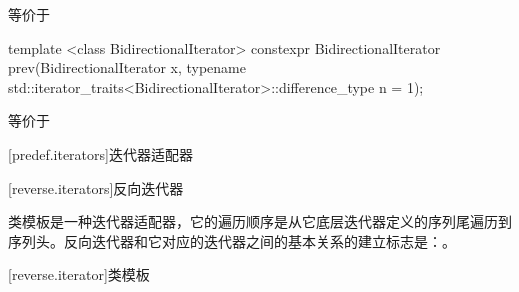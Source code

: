 \begin{itemdescr}
\pnum
\effects
等价于
\end{itemdescr}

%
\begin{itemdecl}
template <class BidirectionalIterator>
  constexpr BidirectionalIterator prev(BidirectionalIterator x,
    typename std::iterator_traits<BidirectionalIterator>::difference_type n = 1);
\end{itemdecl}

\begin{itemdescr}
\pnum
\effects
等价于
\end{itemdescr}

[predef.iterators]{迭代器适配器}

[reverse.iterators]{反向迭代器}

\pnum
类模板是一种迭代器适配器，它的遍历顺序是从它底层迭代器定义的序列尾遍历到序列头。反向迭代器和它对应的迭代器之间的基本关系的建立标志是：。

[reverse.iterator]{类模板}

